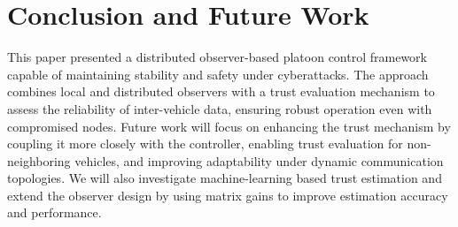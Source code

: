 \documentclass{ifacconf}
\begin{document}
\section{Conclusion and Future Work}\label{sec_conclusion}
\vspace*{-0.2cm}
This paper presented a distributed observer-based platoon control framework capable of maintaining stability and safety under cyberattacks. The approach combines local and distributed observers with a trust evaluation mechanism to assess the reliability of inter-vehicle data, ensuring robust operation even with compromised nodes. 
%
%
Future work will focus on enhancing the trust mechanism by coupling it more closely with the controller, enabling trust evaluation for non-neighboring vehicles, and improving adaptability under dynamic communication topologies. We will also investigate machine-learning based trust estimation and extend the observer design by using matrix gains to improve estimation accuracy and performance.
\end{document}
